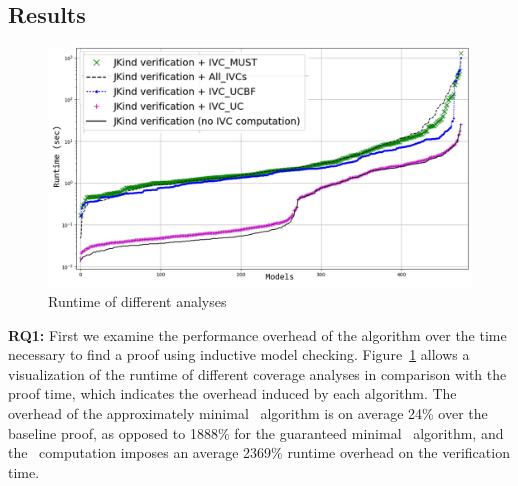 \subsection{Results}
\label{sec:results}

\newcommand{\takeaway}[1]{
\vspace{6pt}
\noindent\fbox{\parbox{0.98\columnwidth}{#1}}
\vspace{6pt}
}

\begin{figure}
  \centering
  \includegraphics[width=\columnwidth]{figs/timing_analyses_all_sorted.jpg}
  \caption{Runtime of different analyses}\label{fig:runtimeall}
\end{figure}

%

\textbf{RQ1:} First we examine the performance overhead of the \ucalg algorithm over the time necessary to find a proof using inductive model checking.
Figure~\ref{fig:runtimeall} allows a visualization of the runtime of different coverage analyses
in comparison with the proof time, which indicates the overhead induced by each algorithm.
The overhead of the approximately minimal \ucalg\ algorithm is on average 24\% over the baseline proof, as opposed to 1888\% for the guaranteed minimal \ucbfalg\ algorithm, and the \mustcov\ computation imposes an average 2369\% runtime overhead on the verification time.


